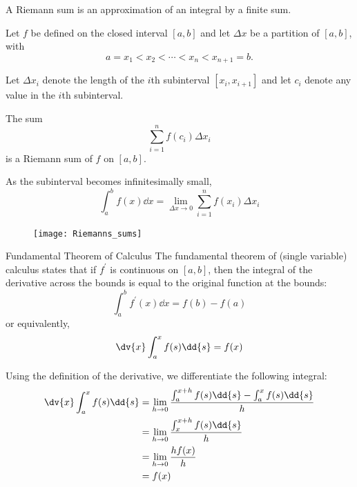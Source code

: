 A Riemann sum is an approximation of an integral by a finite sum.

Let $f$ be defined on the closed interval $[a,b]$ and let $\Delta x$ be a partition of $[a,b]$, with
\[ a=x_1 < x_2 < \cdots < x_n < x_{n+1}=b.\]

Let $\Delta x_i$ denote the length of the $i$th subinterval $[x_i,x_{i+1}]$ and let $c_i$ denote any value in the $i$th subinterval.

The sum
\[ \sum_{i=1}^n f(c_i)\Delta x_i\]
is a Riemann sum of $f$ on $[a,b]$.

As the subinterval becomes infinitesimally small, 
\[ \int _{a}^{b}f(x) \dd{x} = \lim _{\Delta x \to 0} \sum _{i=1}^{n} f(x_{i}) \Delta x_{i} \]

\begin{figure}[H]
	\centering
	\texttt{[image: Riemanns\_sums]}
\end{figure}

\begin{thrm}{Fundamental Theorem of Calculus}{}
The fundamental theorem of (single variable) calculus states that if $f^\prime$ is continuous on $[a,b]$, then the integral of the derivative across the bounds is equal to the original function at the bounds:
\begin{equation}
\int_a^b f^\prime(x) \dd{x} = f(b)-f(a)
\end{equation}
or equivalently,
\begin{equation}
\dv{x} \int_{a}^{x} f(s) \dd{s} = f(x)
\end{equation}
\end{thrm}


Using the definition of the derivative, we differentiate the following integral:
\begin{align*}
\dv{x} \int_{a}^{x} f(s) \dd{s} &= \lim_{h \to 0} \frac{\int_{a}^{x+h} f(s) \dd{s} - \int_{a}^{x} f(s) \dd{s}}{h}\\
&= \lim_{h \to 0} \frac{\int_{x}^{x+h} f(s) \dd{s}}{h}\\
&= \lim_{h \to 0} \frac{h f(x)}{h}\\
&= f(x)
\end{align*}

